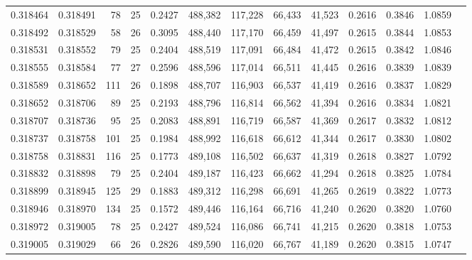 \begin{tabular}{rrrrrrrrrrrrr}
0.318464 & 0.318491 &    78 &  25 &                                     0.2427 & 488,382 & 117,228 &  66,433 &  41,523 & 0.2616 & 0.3846 & 1.0859 \\
0.318492 & 0.318529 &    58 &  26 &                                     0.3095 & 488,440 & 117,170 &  66,459 &  41,497 & 0.2615 & 0.3844 & 1.0853 \\
0.318531 & 0.318552 &    79 &  25 &                                     0.2404 & 488,519 & 117,091 &  66,484 &  41,472 & 0.2615 & 0.3842 & 1.0846 \\
0.318555 & 0.318584 &    77 &  27 &                                     0.2596 & 488,596 & 117,014 &  66,511 &  41,445 & 0.2616 & 0.3839 & 1.0839 \\
0.318589 & 0.318652 &   111 &  26 &                                     0.1898 & 488,707 & 116,903 &  66,537 &  41,419 & 0.2616 & 0.3837 & 1.0829 \\
0.318652 & 0.318706 &    89 &  25 &                                     0.2193 & 488,796 & 116,814 &  66,562 &  41,394 & 0.2616 & 0.3834 & 1.0821 \\
0.318707 & 0.318736 &    95 &  25 &                                     0.2083 & 488,891 & 116,719 &  66,587 &  41,369 & 0.2617 & 0.3832 & 1.0812 \\
0.318737 & 0.318758 &   101 &  25 &                                     0.1984 & 488,992 & 116,618 &  66,612 &  41,344 & 0.2617 & 0.3830 & 1.0802 \\
0.318758 & 0.318831 &   116 &  25 &                                     0.1773 & 489,108 & 116,502 &  66,637 &  41,319 & 0.2618 & 0.3827 & 1.0792 \\
0.318832 & 0.318898 &    79 &  25 &                                     0.2404 & 489,187 & 116,423 &  66,662 &  41,294 & 0.2618 & 0.3825 & 1.0784 \\
0.318899 & 0.318945 &   125 &  29 &                                     0.1883 & 489,312 & 116,298 &  66,691 &  41,265 & 0.2619 & 0.3822 & 1.0773 \\
0.318946 & 0.318970 &   134 &  25 &                                     0.1572 & 489,446 & 116,164 &  66,716 &  41,240 & 0.2620 & 0.3820 & 1.0760 \\
0.318972 & 0.319005 &    78 &  25 &                                     0.2427 & 489,524 & 116,086 &  66,741 &  41,215 & 0.2620 & 0.3818 & 1.0753 \\
0.319005 & 0.319029 &    66 &  26 &                                     0.2826 & 489,590 & 116,020 &  66,767 &  41,189 & 0.2620 & 0.3815 & 1.0747 \\

\end{tabular}
